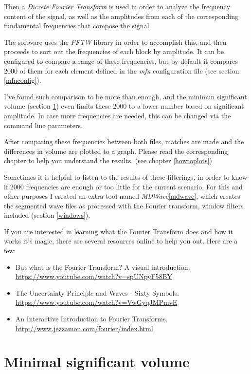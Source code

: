 \documentclass[10pt,a4paper]{report}
\begin{document}
Then a \textit{Dicrete Fourier Transform} is used in order to analyze the frequency content of the signal, as well as the amplitudes from each of the corresponding fundamental frequencies that compose the signal.

The software uses the \textit{FFTW}\cite{fftw} library in order to accomplish this, and then proceeds to sort out the frequencies of each block by amplitude. It can be configured to compare a range of these frequencies, but by default it compares 2000 of them for each element defined in the \textit{mfn} configuration file (see section \ref{mfnconfig}).

I've found such comparison to be more than enough, and the minimun significant volume (section \ref{MinSigVolume}) even limits these 2000 to a lower number based on significant amplitude. In case more frequencies are needed, this can be changed via the command line parameters.

After comparing these frequencies between both files, matches are made and the differences in volume are plotted to a graph. Please read the corresponding chapter to help you understand the results. (see chapter \ref{howtoplots})

Sometimes it is helpful to listen to the results of these filterings, in order to know if 2000 frequencies are enough or too little for the current scenario. For this and other purposes I created an extra tool named \textit{MDWave}\ref{mdwave}, which creates the segmented wave files as processed with the Fourier transform, window filters included (section \ref{windows}).

If you are interested in learning what the Fourier Transform does and how it works it's magic, there are several resources online to help you out. Here are a few:

\begin{itemize}
	\item But what is the Fourier Transform? A visual introduction.  \url{https://www.youtube.com/watch?v=spUNpyF58BY}
	\item The Uncertainty Principle and Waves - Sixty Symbols.  \url{https://www.youtube.com/watch?v=VwGyqJMPmvE}
	\item An Interactive Introduction to Fourier Transforms.  \url{http://www.jezzamon.com/fourier/index.html}
\end{itemize}


\section{Minimal significant volume}
\label{MinSigVolume}
\end{document}
